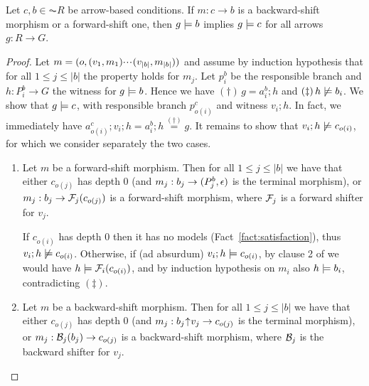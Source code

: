 \begin{proposition}
Let $c,b \in \AC{R}$  be arrow-based conditions. If $m:c\to b$ is a backward-shift morphism or a forward-shift one, then $g\models b$ implies $g \models c$ for all arrows $g:R\to G$. 
\end{proposition}
%
\begin{fullorname}
\begin{proof}
Let $m = (o,(v_1,m_1){\cdotp\mkern-2mu\cdotp\mkern-2mu\cdotp\mkern1mu} (v_{|b|},m_{|b|}))$ and assume by induction hypothesis that for all $1\leq j\leq |b|$ the property holds for $m_j$. Let $p^b_i$ be the responsible branch and $h: P^b_i \to G$ the witness for $g\models b$. 
Hence we have $(\dagger)\, g=a^b_i;h$ and $(\ddagger)\, h \not\models b_i$.  
We show that $g \models c$, with responsible branch $p^c_{o(i)}$ and witness $v_i; h$. In fact, we immediately have  $a^c_{o(i)}; v_i ;h = a^b_i ; h \stackrel{(\dagger)}{=} g$. It remains to show that $v_i ;h \not\models c_{o(i)}$, for which we consider separately the two cases.
\begin{enumerate}
\item Let $m$ be a forward-shift morphism. Then for all $1\leq j\leq |b|$ we have that  either $c_{o(j)}$ has depth 0 (and  $m_j:b_j \rightarrow (P^b_j,\epsilon)$ is the terminal morphism), or  $m_j:b_j \rightarrow \mathcal{F}_j(c_{o(j)})$ is a forward-shift morphism, where $\mathcal{F}_j$ is a forward shifter for $v_j$. 

If $c_{o(i)}$ has depth 0 then it has no models (Fact~\ref{fact:satisfaction}), thus $v_i ;h \not \models c_{o(i)}$. Otherwise, if (ad absurdum) $v_i ;h \models c_{o(i)}$, by clause 2 of  we would have $h \models \mathcal{F}_i(c_{o(i)})$, and by induction hypothesis on $m_i$ also $h \models b_i$, contradicting $(\ddagger)$.

\item Let $m$ be a backward-shift morphism. Then for all $1\leq j\leq |b|$ we have that  either $c_{o(j)}$ has depth 0 (and $m_j:{b_j}{\mskip1mu\uparrow\mskip1mu}{v_j}\rightarrow c_{o(j)}$ is the terminal morphism), or $m_j:\mathcal{B}_j(b_j) \rightarrow c_{o(j)}$ is a backward-shift morphism, where $\mathcal{B}_j$ is the backward  shifter for $v_j$.


\end{enumerate}
\end{proof}
\end{fullorname}
